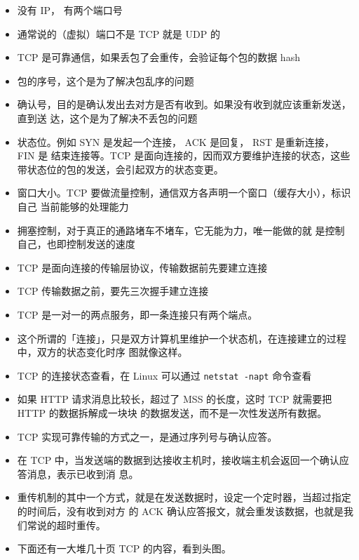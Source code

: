 \begin{itemize}
\item 没有 IP， 有两个端口号
\item 通常说的（虚拟）端口不是 TCP 就是 UDP 的
\item TCP 是可靠通信，如果丢包了会重传，会验证每个包的数据 hash
\item 包的序号，这个是为了解决包乱序的问题
\item 确认号，目的是确认发出去对方是否有收到。如果没有收到就应该重新发送，直到送 达，这个是为了解决不丢包的问题
\item 状态位。例如 SYN 是发起一个连接， ACK 是回复， RST 是重新连接， FIN 是 结束连接等。TCP 是面向连接的，因而双方要维护连接的状态，这些带状态位的包的发送，会引起双方的状态变更。
\item 窗口大小。TCP 要做流量控制，通信双方各声明一个窗口（缓存大小），标识自己 当前能够的处理能力
\item 拥塞控制，对于真正的通路堵车不堵车，它无能为力，唯一能做的就 是控制自己，也即控制发送的速度
\item TCP 是面向连接的传输层协议，传输数据前先要建立连接
\item TCP 传输数据之前，要先三次握手建立连接
\item TCP 是一对一的两点服务，即一条连接只有两个端点。
\item 这个所谓的「连接」，只是双方计算机里维护一个状态机，在连接建立的过程中，双方的状态变化时序 图就像这样。
\item TCP 的连接状态查看，在 Linux 可以通过 \verb`netstat -napt` 命令查看
\item 如果 HTTP 请求消息比较长，超过了 MSS 的长度，这时 TCP 就需要把 HTTP 的数据拆解成一块块 的数据发送，而不是一次性发送所有数据。
\item TCP 实现可靠传输的方式之一，是通过序列号与确认应答。
\item 在 TCP 中，当发送端的数据到达接收主机时，接收端主机会返回一个确认应答消息，表示已收到消 息。
\item 重传机制的其中一个方式，就是在发送数据时，设定一个定时器，当超过指定的时间后，没有收到对方 的      ACK   确认应答报文，就会重发该数据，也就是我们常说的超时重传。
\item 下面还有一大堆几十页 TCP 的内容，看到头图。
\end{itemize}

